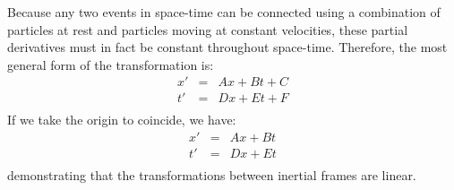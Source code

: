 \documentclass[12pt]{article}
\begin{document}
Because any two events in space-time can be connected using a
combination of particles at rest and particles moving at constant
velocities, these partial derivatives must in fact be constant
throughout space-time.  Therefore, the most general form of the transformation is:
\begin{eqnarray*}
x' &=& A x + B t + C \\
t' &=& D x + E t + F \\
\end{eqnarray*}
If we take the origin to coincide, we have:
\begin{eqnarray*}
x' &=& A x + B t\\
t' &=& D x + E t\\
\end{eqnarray*}
demonstrating that the transformations between inertial frames are linear. 
\end{document}
